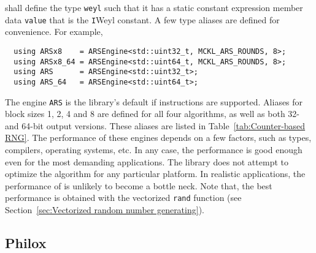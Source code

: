 shall define the type \verb|weyl| such that it has a static constant expression
member data \verb|value| that is the \verb|I|\ith Weyl constant. A few type
aliases are defined for convenience. For example,
\begin{Verbatim}
  using ARSx8    = ARSEngine<std::uint32_t, MCKL_ARS_ROUNDS, 8>;
  using ARSx8_64 = ARSEngine<std::uint64_t, MCKL_ARS_ROUNDS, 8>;
  using ARS      = ARSEngine<std::uint32_t>;
  using ARS_64   = ARSEngine<std::uint64_t>;
\end{Verbatim}
The engine \verb|ARS| is the library's default \rng if \aesni instructions are
supported. Aliases for block sizes 1, 2, 4 and 8 are defined for all four
algorithms, as well as both 32- and 64-bit output versions. These aliases are
listed in Table~\ref{tab:Counter-based RNG}. The performance of these engines
depends on a few factors, such as \cpu types, compilers, operating systems,
etc. In any case, the performance is good enough even for the most demanding
applications. The library does not attempt to optimize the algorithm for any
particular platform. In realistic applications, the performance of \rng is
unlikely to become a bottle neck. Note that, the best performance is obtained
with the vectorized \verb|rand| function (see Section~\ref{sec:Vectorized
  random number generating}).

\subsection{Philox}
\label{sub:Philox}

